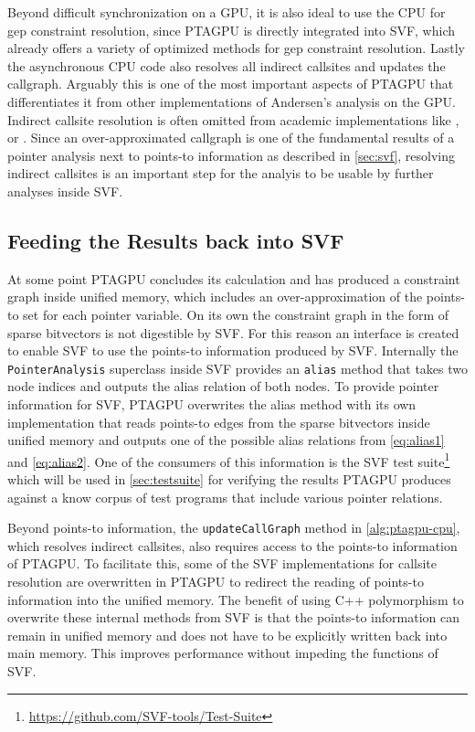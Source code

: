 Beyond difficult synchronization on a GPU, it is also ideal to use the CPU for gep constraint resolution, since PTAGPU is directly integrated into SVF, which already offers a variety of optimized methods for gep constraint resolution.
Lastly the asynchronous CPU code also resolves all indirect callsites and updates the callgraph. 
Arguably this is one of the most important aspects of PTAGPU that differentiates it from other implementations of Andersen's analysis on the GPU.
Indirect callsite resolution is often omitted from academic implementations like \cite{mendez2012gpu}, \cite{zuo2021systemizing} or \cite{su2014parallel}.
Since an over-approximated callgraph is one of the fundamental results of a pointer analysis next to points-to information as described in \autoref{sec:svf}, resolving indirect callsites is an important step for the analyis to be usable by further analyses inside SVF.
\subsection{Feeding the Results back into SVF}\label{sec:feedingback}
At some point PTAGPU concludes its calculation and has produced a constraint graph inside unified memory, which includes an over-approximation of the points-to set for each pointer variable.
On its own the constraint graph in the form of sparse bitvectors is not digestible by SVF. For this reason an interface is created to enable SVF to use the points-to information produced by SVF.
Internally the \verb|PointerAnalysis| superclass inside SVF provides an \verb|alias| method that takes two node indices and outputs the alias relation of both nodes.
To provide pointer information for SVF, PTAGPU overwrites the alias method with its own implementation that reads points-to edges from the sparse bitvectors inside unified memory and outputs one of the possible alias relations from \autoref{eq:alias1} and \autoref{eq:alias2}.
One of the consumers of this information is the SVF test suite\footnote{\url{https://github.com/SVF-tools/Test-Suite}} which will be used in \autoref{sec:testsuite} for verifying the results PTAGPU produces against a know corpus of test programs that include various pointer relations.

Beyond points-to information, the \verb|updateCallGraph| method in \autoref{alg:ptagpu-cpu}, which resolves indirect callsites, also requires access to the points-to information of PTAGPU. To facilitate this, some of the SVF implementations for callsite resolution are overwritten in PTAGPU to redirect the reading of points-to information into the unified memory.
The benefit of using C++ polymorphism to overwrite these internal methods from SVF is that the points-to information can remain in unified memory and does not have to be explicitly written back into main memory.
This improves performance without impeding the functions of SVF.
